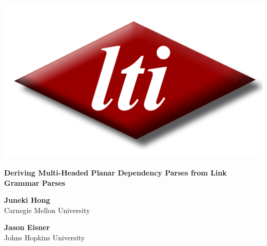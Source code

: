 \documentclass[a0,landscape]{a0poster}
\begin{document}

%
\begin{minipage}[b]{0.19\linewidth}
  \begin{flushleft}
    \includegraphics[width=15cm]{lti_logo.png} %
  \end{flushleft}
\end{minipage}
%
\begin{minipage}[b]{0.55\linewidth}
  \centering \veryHuge \color{NavyBlue} \textbf{Deriving Multi-Headed Planar Dependency Parses from Link Grammar Parses} 
 \color{Black} \\
\begin{minipage}{0.4\linewidth}
  \begin{flushleft}
  \centering \huge \textbf{Juneki Hong}\\
  \centering \huge Carnegie Mellon University 
  \end{flushleft}
\end{minipage}
\begin{minipage}{0.4\linewidth}
  \begin{flushright}
  \centering \huge \textbf{Jason Eisner}\\
  \centering \huge Johns Hopkins University
  \end{flushright}
\end{minipage}
\end{minipage}
\end{document}
